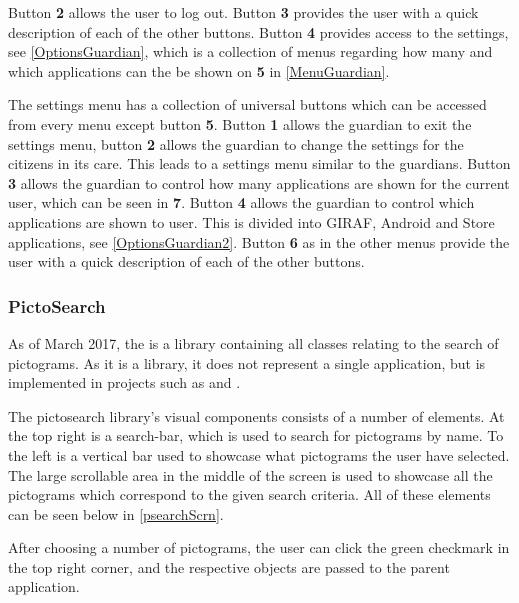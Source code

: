 Button \textbf{2} allows the user to log out. Button \textbf{3} provides the
user with a quick description of each of the other buttons. Button \textbf{4}
provides access to the settings, see \autoref{OptionsGuardian}, which is a
collection of menus regarding how many and which applications can the be shown
on \textbf{5} in \autoref{MenuGuardian}. 


The settings menu has a collection of universal buttons which can be accessed
from every menu except button \textbf{5}. Button \textbf{1} allows the guardian
to exit the settings menu, button \textbf{2} allows the guardian to change the settings for
the citizens in its care. This leads to a settings menu similar to the guardians.
Button \textbf{3} allows the guardian to control how many applications are
shown for the current user, which can be seen in \textbf{7}. Button \textbf{4}
allows the guardian to control which applications are shown to user. This is
divided into GIRAF, Android and Store applications, see
\autoref{OptionsGuardian2}. Button \textbf{6} as in the other menus provide the
user with a quick description of each of the other buttons.


\subsubsection{PictoSearch}\label{PictoSearchReview}
As of March 2017, the  is a library containing all
classes relating to the search of pictograms. As it is a library, it does not
represent a single application, but is implemented in projects such as
 and .\nl

The pictosearch library's visual components consists of a number of
elements. At the top right is a search-bar, which is used to search for
pictograms by name. To the left is a vertical bar used to showcase what
pictograms the user have selected. The large scrollable area in the middle of
the screen is used to showcase all the pictograms which correspond to the given
search criteria. All of these elements can be seen below in
\autoref{psearchScrn}.
 

After choosing a number of pictograms, the user can click the green checkmark in
the top right corner, and the respective  objects are passed to
the parent application.
